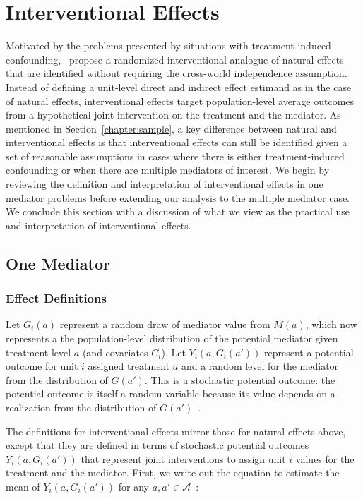 \chapter{Interventional Effects}

Motivated by the problems presented by situations with treatment-induced confounding,~\cite{vanderweeleetal2014} 
propose a randomized-interventional analogue of natural effects that are identified without 
requiring the cross-world independence assumption. Instead of defining 
a unit-level direct and indirect effect estimand as in the case of natural effects, interventional effects
target population-level average outcomes from a hypothetical joint intervention on the treatment and the 
mediator. As mentioned in Section~\ref{chapter:sample}, a key difference between natural and interventional effects
is that interventional effects can still be identified given a set of reasonable assumptions in cases where
there is either treatment-induced confounding or when there are multiple mediators of interest. We begin by
reviewing the definition and interpretation of interventional effects in one mediator problems before 
extending our analysis to the multiple mediator case. We conclude this section with a discussion of what we
view as the practical use and interpretation of interventional effects. 

\section{One Mediator}

\subsection{Effect Definitions}\label{subsection:intv_eff_defs}

Let $G_{i}(a)$ represent a random draw of mediator value from $M(a)$, which now represents a 
the population-level distribution of the potential mediator given treatment level $a$ (and covariates $C_{i}$).
Let $Y_{i}(a,G_{i}(a'))$ represent a potential outcome for unit $i$ assigned treatment $a$ and
a random level for the mediator from the distribution of $G(a')$. This is a stochastic potential 
outcome: the potential outcome is itself a random variable because its value depends on a realization
from the distribution of $G(a')$~\citep{vanderweelerobins2012}. 

The definitions for interventional effects mirror those for natural effects above, except that they are
defined in terms of stochastic potential outcomes $Y_{i}(a,G_{i}(a'))$ that represent joint interventions
to assign unit $i$ values for the treatment and the mediator. First, we write out the equation to estimate
the mean of $Y_{i}(a,G_{i}(a'))$ for any $a, a' \in \mathcal{A}$~\citep{kuhaetal2021}: 

